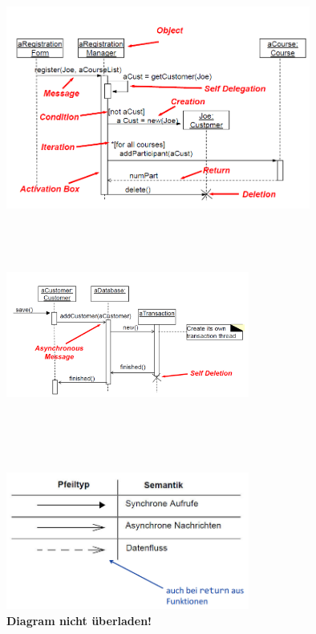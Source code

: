 \begin{minipage}[hbt]{1cm}
	\centering
	\includegraphics[height=8cm, width = 10cm,]{images/Modellierung/Sequenzdiagramm}
	\label{Bild1}
\end{minipage}
\hfill
\begin{minipage}[hbt]{8cm}
	\centering
	\includegraphics[height=6cm, width = 8cm,]{images/Modellierung/Sequenzdiagramm2}
	\label{Bild2}
\end{minipage}\\\\

\includegraphics[width = 8cm]{images/Modellierung/Pfeiltypen_Aktivitaetsdiagramm}\\

\textbf{Diagram nicht überladen!} 

